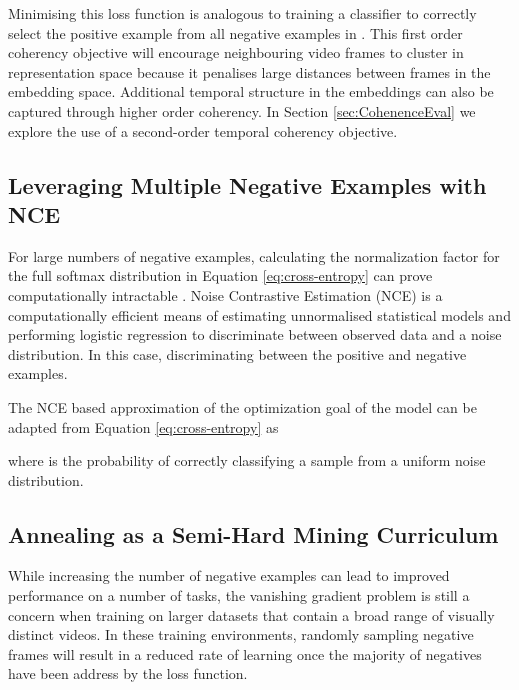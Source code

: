 \documentclass[a4paper,conference]{IEEEtran}
\begin{document}
Minimising this loss function is analogous to training a classifier to correctly select the positive example from all negative examples in . This first order coherency objective will encourage neighbouring video frames to cluster in representation space because it penalises large distances between frames in the embedding space. Additional temporal structure in the embeddings can also be captured through higher order coherency. In Section \ref{sec:CohenenceEval} we explore the use of a second-order temporal coherency objective.












\subsection{Leveraging Multiple Negative Examples with NCE}

For large numbers of negative examples, calculating the normalization factor for the full softmax distribution in Equation \ref{eq:cross-entropy} can prove computationally intractable \cite{mnih2013learning}. Noise Contrastive Estimation (NCE) \cite{gutmann2010noise} is a computationally efficient means of estimating unnormalised statistical models and performing logistic regression to discriminate between observed data and a noise distribution. In this case, discriminating between the positive and negative examples. 
    










The NCE based approximation of the optimization goal of the model can be adapted from Equation \ref{eq:cross-entropy} as


where  is the probability of correctly classifying a sample from a uniform noise distribution. 
  
\subsection{Annealing as a Semi-Hard Mining Curriculum}
\label{sec:mining}

While increasing the number of negative examples can lead to improved performance on a number of tasks, the vanishing gradient problem is still a concern when training on larger datasets that contain a broad range of visually distinct videos. In these training environments, randomly sampling negative frames will result in a reduced rate of learning once the majority of negatives have been address by the loss function.
\end{document}
